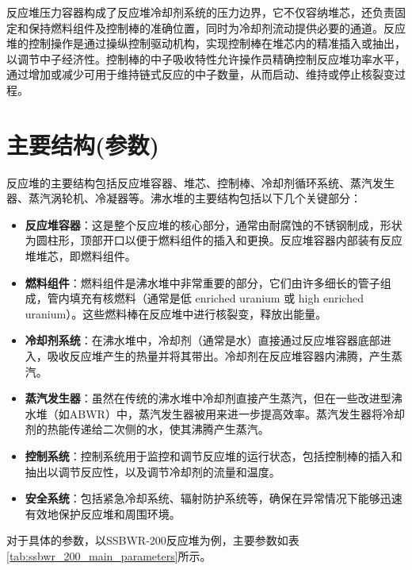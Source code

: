 \documentclass{article}
\begin{document}
反应堆压力容器构成了反应堆冷却剂系统的压力边界，它不仅容纳堆芯，还负责固定和保持燃料组件及控制棒的准确位置，同时为冷却剂流动提供必要的通道。反应堆的控制操作是通过操纵控制驱动机构，实现控制棒在堆芯内的精准插入或抽出，以调节中子经济性。控制棒的中子吸收特性允许操作员精确控制反应堆功率水平，通过增加或减少可用于维持链式反应的中子数量，从而启动、维持或停止核裂变过程。\cite{robinIntroductionNuclearReactors}


\section{主要结构(参数)}

反应堆的主要结构包括反应堆容器、堆芯、控制棒、冷却剂循环系统、蒸汽发生器、蒸汽涡轮机、冷凝器等。沸水堆的主要结构包括以下几个关键部分：\cite{ChenJing600MWXiaoXingXianJinFeiShuiDuiGaiNianSheJiPdf1999}\cite{ChenJingXiaoXingJianHuaFeiShuiDuiYanJiuPdf2003}
\begin{itemize}
    \item \textbf{反应堆容器}：这是整个反应堆的核心部分，通常由耐腐蚀的不锈钢制成，形状为圆柱形，顶部开口以便于燃料组件的插入和更换。反应堆容器内部装有反应堆堆芯，即燃料组件。
    \item \textbf{燃料组件}：燃料组件是沸水堆中非常重要的部分，它们由许多细长的管子组成，管内填充有核燃料（通常是低 enriched uranium 或 high enriched uranium）。这些燃料棒在反应堆中进行核裂变，释放出能量。
    \item \textbf{冷却剂系统}：在沸水堆中，冷却剂（通常是水）直接通过反应堆容器底部进入，吸收反应堆产生的热量并将其带出。冷却剂在反应堆容器内沸腾，产生蒸汽。
    \item \textbf{蒸汽发生器}：虽然在传统的沸水堆中冷却剂直接产生蒸汽，但在一些改进型沸水堆（如ABWR）中，蒸汽发生器被用来进一步提高效率。蒸汽发生器将冷却剂的热能传递给二次侧的水，使其沸腾产生蒸汽。
    \item \textbf{控制系统}：控制系统用于监控和调节反应堆的运行状态，包括控制棒的插入和抽出以调节反应性，以及调节冷却剂的流量和温度。
    \item \textbf{安全系统}：包括紧急冷却系统、辐射防护系统等，确保在异常情况下能够迅速有效地保护反应堆和周围环境。
\end{itemize}

对于具体的参数，以SSBWR-200反应堆为例，主要参数如表\ref{tab:ssbwr_200_main_parameters}所示。\cite{ChenJingJianHuaFeiShuiDuiSSBWR200DeReGongSheJiHeShiGuFenXi2001}
\end{document}
